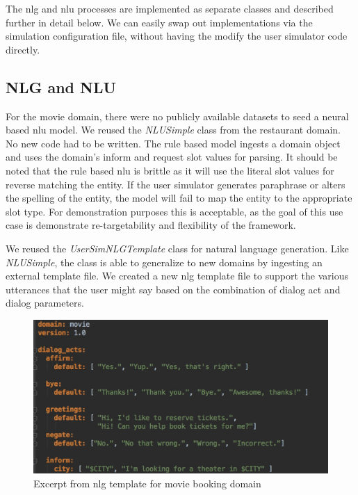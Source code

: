 The nlg and nlu processes are implemented as separate classes and described further in detail below. We can easily swap out implementations via the simulation configuration file, without having the modify the user simulator code directly.

\subsection{NLG and NLU}

For the movie domain, there were no publicly available datasets to seed a neural based nlu model. We reused the \textit{NLUSimple} class from the restaurant domain. No new code had to be written. The rule based model ingests a domain object and uses the domain's inform and request slot values for parsing. It should be noted that the rule based nlu is brittle as it will use the literal slot values for reverse matching the entity. If the user simulator generates paraphrase or alters the spelling of the entity, the model will fail to map the entity to the appropriate slot type. For demonstration purposes this is acceptable, as the goal of this use case is demonstrate re-targetability and flexibility of the framework.

We reused the \textit{UserSimNLGTemplate} class for natural language generation. Like \textit{NLUSimple}, the class is able to generalize to new domains by ingesting an external template file. We created a new nlg template file to support the various utterances that the user might say based on the combination of dialog act and dialog parameters. 

\begin{figure}[h!]
	\centering
	\includegraphics[scale=.25]{diagrams/movie_nlg_template.jpeg}
	\caption{Excerpt from nlg template for movie booking domain }
	\label{fig:movie_nlg}
\end{figure}

